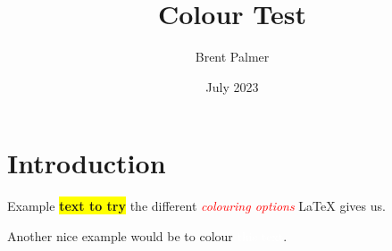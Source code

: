 \documentclass{article}
\title{Colour Test}
\author{Brent Palmer}
\date{July 2023}
\begin{document}
\maketitle

\section{Introduction}

Example \colorbox{yellow}{\textbf{text to try}} the different \textcolor{red}{\textit{colouring options}} LaTeX gives us. 

Another nice example would be to colour \colorbox{blue!80}{\textcolor{white}{this text}}.
\end{document}
